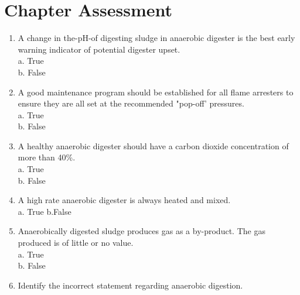 \section*{Chapter Assessment}
\begin{tcolorbox}[breakable, enhanced,
colframe=blue!25,
colback=blue!10,
coltitle=blue!20!black,  
title= Chapter Assessment]

\begin{enumerate}

\item  A change in the-pH-of digesting sludge in anaerobic digester is the best early warning indicator of potential digester upset. \\

a. True \\
b. False \\

\item  A good maintenance program should be established for all flame arresters to ensure they are all set at the recommended "pop-off' pressures. \\

a. True \\
b. False \\

\item  A healthy anaerobic digester should have a carbon dioxide concentration of more than 40\%. \\

a. True \\
b. False \\

\item  A high rate anaerobic digester is always heated and mixed. \\

a. True
b.False \\

\item  Anaerobically digested sludge produces gas as a by-product. The gas produced is of little or no value. \\

a. True \\
b. False \\

\item  Identify the incorrect statement regarding anaerobic digestion. \\


\end{enumerate}
\end{tcolorbox}
